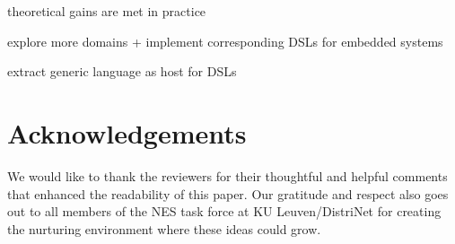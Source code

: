 \documentclass[conference]{IEEEtran}
\begin{document}
theoretical gains are met in practice

explore more domains + implement corresponding DSLs for embedded systems

extract generic language as host for DSLs

\section*{Acknowledgements}

We would like to thank the reviewers for their thoughtful and helpful comments
that enhanced the readability of this paper. Our gratitude and respect also
goes out to all members of the NES task force at KU Leuven/DistriNet for
creating the nurturing environment where these ideas could grow.



\end{document}
